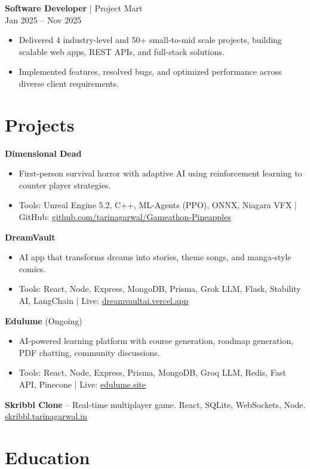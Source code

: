 \documentclass[10pt,a4paper]{article}
\begin{document}
\textbf{Software Developer} | Project Mart \\
Jan 2025 -- Nov 2025
\begin{itemize}
\item Delivered 4 industry-level and 50+ small-to-mid scale projects, building scalable web apps, REST APIs, and full-stack solutions.
\item Implemented features, resolved bugs, and optimized performance across diverse client requirements.
\end{itemize}

\section*{Projects}

\textbf{Dimensional Dead}
\begin{itemize}
\item First-person survival horror with adaptive AI using reinforcement learning to counter player strategies.
\item Tools: Unreal Engine 5.2, C++, ML-Agents (PPO), ONNX, Niagara VFX | GitHub: \href{https://github.com/tarinagarwal/Gameathon-Pineapples}{github.com/tarinagarwal/Gameathon-Pineapples}
\end{itemize}

\textbf{DreamVault}
\begin{itemize}
\item AI app that transforms dreams into stories, theme songs, and manga-style comics.
\item Tools: React, Node, Express, MongoDB, Prisma, Grok LLM, Flask, Stability AI, LangChain | Live: \href{https://dreamvaultai.vercel.app}{dreamvaultai.vercel.app}
\end{itemize}

\textbf{Edulume} (Ongoing)
\begin{itemize}
\item AI-powered learning platform with course generation, roadmap generation, PDF chatting, community discussions.
\item Tools: React, Node, Express, Prisma, MongoDB, Groq LLM, Redis, Fast API, Pinecone | Live: \href{https://edulume.site}{edulume.site}
\end{itemize}

\textbf{Skribbl Clone} -- Real-time multiplayer game. React, SQLite, WebSockets, Node. \href{https://skribbl.tarinagarwal.in}{skribbl.tarinagarwal.in}

\section*{Education}
\end{document}
